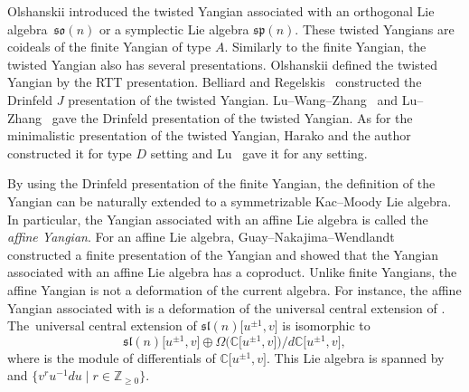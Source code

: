 \documentclass[pdftex]{sigma}
\numberwithin{equation}{section}
\theoremstyle{definition}
\begin{document}
Olshanskii \cite{O} introduced the twisted Yangian associated with an orthogonal Lie algebra~$\mathfrak{so}(n)$ or a symplectic Lie algebra $\mathfrak{sp}(n)$. These twisted Yangians are coideals of the finite Yangian of type $A$. Similarly to the finite Yangian, the twisted Yangian also has several presentations. Olshanskii defined the twisted Yangian by the RTT presentation. Belliard and Regelskis~\cite{BR1} constructed the Drinfeld $J$ presentation of the twisted Yangian. Lu--Wang--Zhang~\mbox{\cite{LWZ0,LWZ}} and Lu--Zhang~\cite{LWZ1} gave the Drinfeld presentation of the twisted Yangian. As for the minimalistic presentation of the twisted Yangian, Harako and the author~\cite{HU} constructed it for type $D$ setting and Lu~\cite{L} gave it for any setting.

By using the Drinfeld presentation of the finite Yangian, the definition of the Yangian can be naturally extended to a symmetrizable Kac--Moody Lie algebra. In particular, the Yangian associated with an affine Lie algebra is called the {\it affine Yangian}. For an affine Lie algebra, Guay--Nakajima--Wendlandt~\cite{GNW} constructed a finite presentation of the Yangian and showed that the Yangian associated with an affine Lie algebra has a coproduct. Unlike finite Yangians, the affine Yangian is not a deformation of the current algebra. For instance, the affine Yangian associated with  is a deformation of the universal central extension of . The~universal central extension of $\mathfrak{sl}(n)\bigl[u^{\pm1},v\bigr]$ is isomorphic to
\begin{equation*}
\mathfrak{sl}(n)\bigl[u^{\pm1},v\bigr]\oplus\Omega\bigl(\mathbb{C}\bigl[u^{\pm1},v\bigr]\bigr)/ d \mathbb{C}\bigl[u^{\pm1},v\bigr],
\end{equation*}
where  is the module of differentials of $\mathbb{C}\bigl[u^{\pm1},v\bigr]$. This Lie algebra is spanned by~ and $\bigl\{v^{r}u^{-1}{d}u\mid r\in\mathbb{Z}_{\geq0}\bigr\}$.
\end{document}
